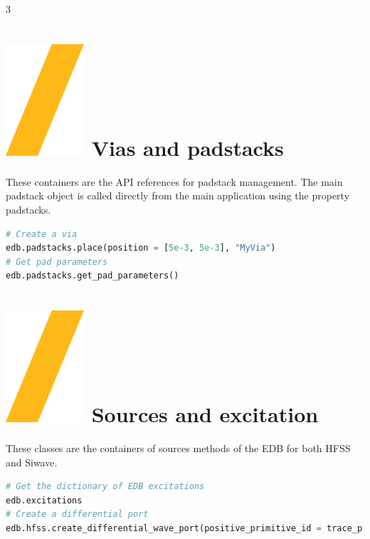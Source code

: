 \documentclass[landscape]{article}
\begin{document}
\begin{multicols}{3}
\section{\includegraphics[height=\fontcharht\font`\S]{slash.png} Vias and padstacks}
These containers are the API references for padstack management. The main padstack object is called directly from the main application using the property padstacks.
\begin{lstlisting}[language=Python]
# Create a via
edb.padstacks.place(position = [5e-3, 5e-3], "MyVia")
# Get pad parameters
edb.padstacks.get_pad_parameters()
\end{lstlisting}

\section{\includegraphics[height=\fontcharht\font`\S]{slash.png} Sources and excitation}
These classes are the containers of sources methods of the EDB for both HFSS and Siwave.

\begin{lstlisting}[language=Python]
# Get the dictionary of EDB excitations
edb.excitations
# Create a differential port
edb.hfss.create_differential_wave_port(positive_primitive_id = trace_p[0].id, positive_points_on_edge = p1_points, negative_primitive_id = trace_n[0].id, negative_points_on_edge = n1_points, name = "wave_port_1")



\end{lstlisting}
\end{multicols}
\end{document}
